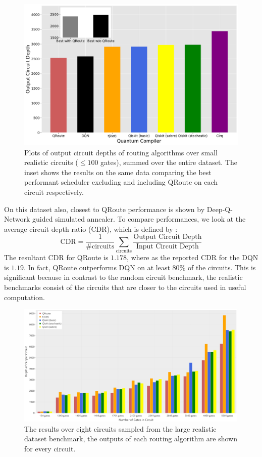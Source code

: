 \documentclass[%
 reprint,
amsmath,amssymb,showkeys,
pra,
]{revtex4-2}
\begin{document}
\begin{figure}[t]
    \includegraphics[width=\linewidth]{images/realistic_small_benchmark.pdf}
    \caption{\label{fig:results-small}
        Plots of output circuit depths of routing algorithms over small realistic circuits ($\leq 100$ gates), summed over the entire dataset. The inset shows the results on the same data comparing the best performant scheduler excluding and including QRoute on each circuit respectively.}
\end{figure}

On this dataset also, closest to QRoute performance is shown by Deep-Q-Network guided simulated annealer. To compare performances, we look at the average circuit depth ratio (CDR), which is defined by \citep{qroute_dqn2}:
\begin{equation}
    \text{CDR} = \frac{1}{\textrm{\#circuits}} \sum_{\textrm{circuits}} \frac{\textrm{Output Circuit Depth}}{\textrm{Input Circuit Depth}}
    \label{eq:CDR}
\end{equation}
The resultant CDR for QRoute is $1.178$, where as the reported CDR for the DQN is $1.19$. In fact, QRoute outperforms DQN on at least $80\%$ of the circuits. This is significant because in contrast to the random circuit benchmark, the realistic benchmarks consist of the circuits that are closer to the circuits used in useful computation.

\begin{figure}[ht]
    \includegraphics[width=\linewidth,height=222px]{images/realistic_large_benchmark.pdf}
    \caption{\label{fig:results-large}
        The results over eight circuits sampled from the large realistic dataset benchmark, the outputs of each routing algorithm are shown for every circuit.}
\end{figure}
\end{document}
